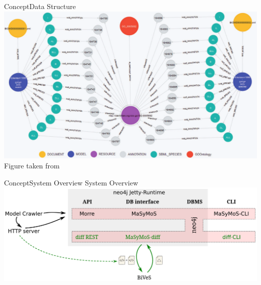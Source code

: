 \begin{frame}{Concept}{\masymos Data Structure}
	\centering
	\includegraphics[width=\linewidth,height=\textheight,keepaspectratio]{./figures/masymos-small.png}\\
	{\small Figure taken from \citealt{Henkel2015}}
\end{frame}

\begin{frame}{Concept}{System Overview}
	{\LARGE System Overview}
	\\[2.5em]
	\centering
	\vfill
	\includegraphics[width=\linewidth,height=\textheight,keepaspectratio]{../tex/resources/system-overview-matrix.pdf}
	\vfill
\end{frame}

